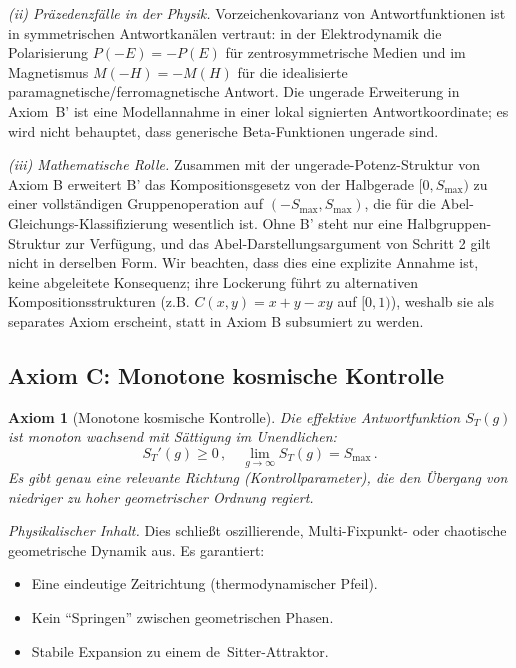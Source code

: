 \documentclass[aps,prd,twocolumn,superscriptaddress,nofootinbib]{revtex4-2}
\newtheorem{axiom}{Axiom}
\begin{document}
\textit{(ii) Präzedenzfälle in der Physik.} Vorzeichenkovarianz von Antwortfunktionen ist in symmetrischen Antwortkanälen vertraut: in der Elektrodynamik die Polarisierung $P(-E) = -P(E)$ für zentrosymmetrische Medien und im Magnetismus $M(-H) = -M(H)$ für die idealisierte paramagnetische/ferromagnetische Antwort. Die ungerade Erweiterung in Axiom~B' ist eine Modellannahme in einer lokal signierten Antwortkoordinate; es wird nicht behauptet, dass generische Beta-Funktionen ungerade sind.

\textit{(iii) Mathematische Rolle.} Zusammen mit der ungerade-Potenz-Struktur von Axiom B erweitert B' das Kompositionsgesetz von der Halbgerade $[0, S_{\max})$ zu einer vollständigen Gruppenoperation auf $(-S_{\max}, S_{\max})$, die für die Abel-Gleichungs-Klassifizierung wesentlich ist. Ohne B' steht nur eine Halbgruppen-Struktur zur Verfügung, und das Abel-Darstellungsargument von Schritt 2 gilt nicht in derselben Form. Wir beachten, dass dies eine explizite Annahme ist, keine abgeleitete Konsequenz; ihre Lockerung führt zu alternativen Kompositionsstrukturen (z.B. $C(x,y) = x + y - xy$ auf $[0,1)$), weshalb sie als separates Axiom erscheint, statt in Axiom B subsumiert zu werden.

\subsection{Axiom C: Monotone kosmische Kontrolle}

\begin{axiom}[Monotone kosmische Kontrolle]
\label{ax:monotone}
Die effektive Antwortfunktion $S_T(g)$ ist monoton wachsend mit Sättigung im Unendlichen:
\begin{equation}
S_T'(g) \geq 0\,, \quad \lim_{g \to \infty} S_T(g) = S_{\max}\,.
\label{eq:monotone}
\end{equation}
Es gibt genau eine relevante Richtung (Kontrollparameter), die den Übergang von niedriger zu hoher geometrischer Ordnung regiert.
\end{axiom}

\textit{Physikalischer Inhalt.} Dies schließt oszillierende, Multi-Fixpunkt- oder chaotische geometrische Dynamik aus. Es garantiert:
\begin{itemize}
\item Eine eindeutige Zeitrichtung (thermodynamischer Pfeil).
\item Kein ``Springen'' zwischen geometrischen Phasen.
\item Stabile Expansion zu einem de~Sitter-Attraktor.
\end{itemize}
\end{document}
